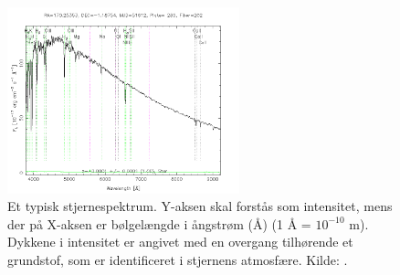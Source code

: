 \begin{figure}[h!]
	\centering
	\includegraphics[width=0.6\textwidth]{Kosmo/2017/img/spektrum.png}
	\caption{Et typisk stjernespektrum. Y-aksen skal forstås som intensitet, mens der
		på X-aksen er bølgelængde i ångstrøm (Å) (1 Å = $10^{-10}$ m). Dykkene i intensitet
		er angivet med en overgang tilhørende et grundstof, som er identificeret i stjernens
		atmosfære. Kilde: \cite{Stjernespektrum}.}
	\label{spektrum}
\end{figure}

